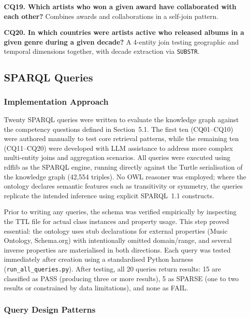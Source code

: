 \documentclass[11pt,a4paper]{article}
\begin{document}
\textbf{CQ19. Which artists who won a given award have collaborated with each other?} Combines awards and collaborations in a self-join pattern.

\textbf{CQ20. In which countries were artists active who released albums in a given genre during a given decade?} A 4-entity join testing geographic and temporal dimensions together, with decade extraction via \texttt{SUBSTR}.

\subsection{SPARQL Queries}

\subsubsection{Implementation Approach}

Twenty SPARQL queries were written to evaluate the knowledge graph against the competency questions defined in Section~5.1. The first ten (CQ01--CQ10) were authored manually to test core retrieval patterns, while the remaining ten (CQ11--CQ20) were developed with LLM assistance to address more complex multi-entity joins and aggregation scenarios. All queries were executed using rdflib as the SPARQL engine, running directly against the Turtle serialisation of the knowledge graph (42,554 triples). No OWL reasoner was employed; where the ontology declares semantic features such as transitivity or symmetry, the queries replicate the intended inference using explicit SPARQL~1.1 constructs.

Prior to writing any queries, the schema was verified empirically by inspecting the TTL file for actual class instances and property usage. This step proved essential: the ontology uses stub declarations for external properties (Music Ontology, Schema.org) with intentionally omitted domain/range, and several inverse properties are materialised in both directions. Each query was tested immediately after creation using a standardised Python harness (\texttt{run\_all\_queries.py}). After testing, all 20 queries return results: 15 are classified as PASS (producing three or more results), 5 as SPARSE (one to two results or constrained by data limitations), and none as FAIL.

\subsubsection{Query Design Patterns}
\end{document}
